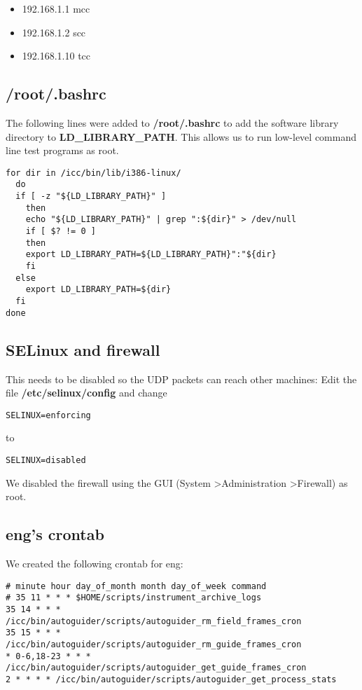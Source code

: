 \documentclass[10pt,a4paper]{article}
\begin{document}
\begin{itemize}
\item 192.168.1.1     mcc
\item 192.168.1.2     scc
\item 192.168.1.10    tcc
\end{itemize}

\subsection{/root/.bashrc}

The following lines were added to {\bf /root/.bashrc} to add the software library directory to
{\bf LD\_LIBRARY\_PATH}. This allows us to run low-level command line test programs as root.

\begin{verbatim}
for dir in /icc/bin/lib/i386-linux/ 
  do
  if [ -z "${LD_LIBRARY_PATH}" ] 
    then
    echo "${LD_LIBRARY_PATH}" | grep ":${dir}" > /dev/null
    if [ $? != 0 ] 
    then
	export LD_LIBRARY_PATH=${LD_LIBRARY_PATH}":"${dir}
    fi
  else
    export LD_LIBRARY_PATH=${dir}
  fi
done
\end{verbatim}

\subsection{SELinux and firewall}

This needs to be disabled so the UDP packets can reach other machines:
Edit the file {\bf /etc/selinux/config} and change

\begin{verbatim}
SELINUX=enforcing
\end{verbatim}

to

\begin{verbatim}
SELINUX=disabled
\end{verbatim}

We disabled the firewall using the GUI (System \textgreater Administration \textgreater Firewall) as root.

\subsection{eng's crontab}

We created the following crontab for eng:
\begin{verbatim}
# minute hour day_of_month month day_of_week command
# 35 11 * * * $HOME/scripts/instrument_archive_logs
35 14 * * * /icc/bin/autoguider/scripts/autoguider_rm_field_frames_cron
35 15 * * * /icc/bin/autoguider/scripts/autoguider_rm_guide_frames_cron
* 0-6,18-23 * * * /icc/bin/autoguider/scripts/autoguider_get_guide_frames_cron
2 * * * * /icc/bin/autoguider/scripts/autoguider_get_process_stats
\end{verbatim}
\end{document}
